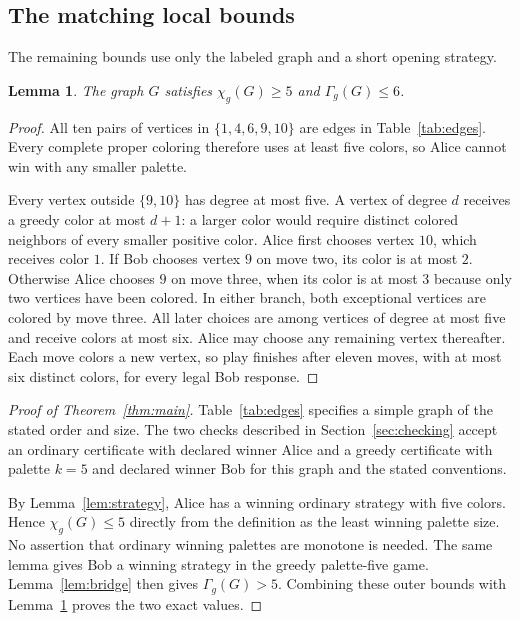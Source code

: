 \documentclass[11pt]{article}
\newtheorem{lemma}{Lemma}
\newcommand{\chig}{\chi_g}
\newcommand{\Gammag}{\Gamma_g}
\begin{document}
\subsection{The matching local bounds}
The remaining bounds use only the labeled graph and a short opening strategy.

\begin{lemma}\label{lem:local}
The graph $G$ satisfies $\chig(G)\geq5$ and $\Gammag(G)\leq6$.
\end{lemma}

\begin{proof}
All ten pairs of vertices in $\{1,4,6,9,10\}$ are edges in
Table~\ref{tab:edges}. Every complete proper coloring therefore uses
at least five colors, so Alice cannot win with any smaller palette.

Every vertex outside $\{9,10\}$ has degree at most five. A vertex of
degree $d$ receives a greedy color at most $d+1$: a larger color would
require distinct colored neighbors of every smaller positive color.
Alice first chooses vertex $10$, which receives color $1$.
If Bob chooses vertex $9$ on move two, its color is at most $2$.
Otherwise Alice chooses $9$ on move three, when its color is at most
$3$ because only two vertices have been colored. In either branch,
both exceptional vertices are colored by move three. All later choices
are among vertices of degree at most five and receive colors at most
six. Alice may choose any remaining vertex thereafter. Each move
colors a new vertex, so play finishes after eleven moves, with at most
six distinct colors, for every legal Bob response.
\end{proof}

\begin{proof}[Proof of Theorem~\ref{thm:main}]
Table~\ref{tab:edges} specifies a simple graph of the stated order and
size. The two checks described in Section~\ref{sec:checking} accept an
ordinary certificate with declared winner Alice and a greedy
certificate with palette $k=5$ and declared winner Bob for this graph and
the stated conventions.

By Lemma~\ref{lem:strategy}, Alice has a winning ordinary strategy with
five colors. Hence $\chig(G)\leq5$ directly from the definition as the
least winning palette size. No assertion that ordinary winning
palettes are monotone is needed. The same lemma gives Bob a winning
strategy in the greedy palette-five game. Lemma~\ref{lem:bridge} then
gives $\Gammag(G)>5$. Combining these outer bounds with
Lemma~\ref{lem:local} proves the two exact values.
\end{proof}
\end{document}
